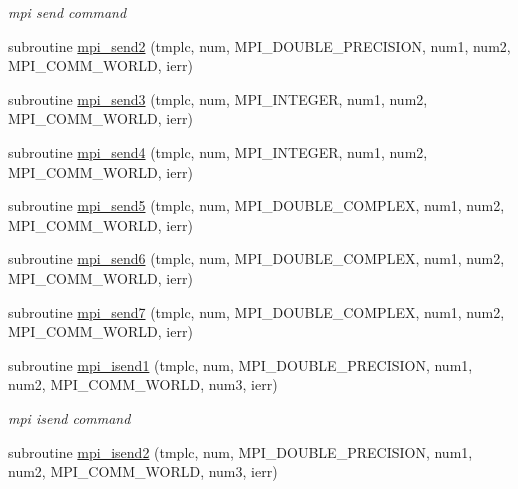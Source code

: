 \begin{DoxyCompactItemize}
\begin{DoxyCompactList}\small\item\em mpi send command \end{DoxyCompactList}\item 
subroutine \mbox{\hyperlink{namespacempistub_a6c4e68898245f7cb86fa2854a852a0e4}{mpi\+\_\+send2}} (tmplc, num, M\+P\+I\+\_\+\+D\+O\+U\+B\+L\+E\+\_\+\+P\+R\+E\+C\+I\+S\+I\+ON, num1, num2, M\+P\+I\+\_\+\+C\+O\+M\+M\+\_\+\+W\+O\+R\+LD, ierr)
\item 
subroutine \mbox{\hyperlink{namespacempistub_aa2236bd3615856981e15e75fd85bce13}{mpi\+\_\+send3}} (tmplc, num, M\+P\+I\+\_\+\+I\+N\+T\+E\+G\+ER, num1, num2, M\+P\+I\+\_\+\+C\+O\+M\+M\+\_\+\+W\+O\+R\+LD, ierr)
\item 
subroutine \mbox{\hyperlink{namespacempistub_a1c957856f9f59c126b5a38101eb016b2}{mpi\+\_\+send4}} (tmplc, num, M\+P\+I\+\_\+\+I\+N\+T\+E\+G\+ER, num1, num2, M\+P\+I\+\_\+\+C\+O\+M\+M\+\_\+\+W\+O\+R\+LD, ierr)
\item 
subroutine \mbox{\hyperlink{namespacempistub_a46c983917eca3492fa5ad9eadbb25b2e}{mpi\+\_\+send5}} (tmplc, num, M\+P\+I\+\_\+\+D\+O\+U\+B\+L\+E\+\_\+\+C\+O\+M\+P\+L\+EX, num1, num2, M\+P\+I\+\_\+\+C\+O\+M\+M\+\_\+\+W\+O\+R\+LD, ierr)
\item 
subroutine \mbox{\hyperlink{namespacempistub_a1a0436836f0028c31fba295fbbe17859}{mpi\+\_\+send6}} (tmplc, num, M\+P\+I\+\_\+\+D\+O\+U\+B\+L\+E\+\_\+\+C\+O\+M\+P\+L\+EX, num1, num2, M\+P\+I\+\_\+\+C\+O\+M\+M\+\_\+\+W\+O\+R\+LD, ierr)
\item 
subroutine \mbox{\hyperlink{namespacempistub_a572c98a51712ea28686e837f62e0a660}{mpi\+\_\+send7}} (tmplc, num, M\+P\+I\+\_\+\+D\+O\+U\+B\+L\+E\+\_\+\+C\+O\+M\+P\+L\+EX, num1, num2, M\+P\+I\+\_\+\+C\+O\+M\+M\+\_\+\+W\+O\+R\+LD, ierr)
\item 
subroutine \mbox{\hyperlink{namespacempistub_a2aebc613876246484fb3daea092c2abe}{mpi\+\_\+isend1}} (tmplc, num, M\+P\+I\+\_\+\+D\+O\+U\+B\+L\+E\+\_\+\+P\+R\+E\+C\+I\+S\+I\+ON, num1, num2, M\+P\+I\+\_\+\+C\+O\+M\+M\+\_\+\+W\+O\+R\+LD, num3, ierr)
\begin{DoxyCompactList}\small\item\em mpi isend command \end{DoxyCompactList}\item 
subroutine \mbox{\hyperlink{namespacempistub_ac35bd42a69c258e2cc6e8db36212b3aa}{mpi\+\_\+isend2}} (tmplc, num, M\+P\+I\+\_\+\+D\+O\+U\+B\+L\+E\+\_\+\+P\+R\+E\+C\+I\+S\+I\+ON, num1, num2, M\+P\+I\+\_\+\+C\+O\+M\+M\+\_\+\+W\+O\+R\+LD, num3, ierr)

\end{DoxyCompactItemize}
